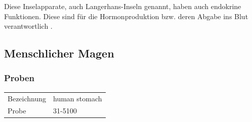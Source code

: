 Diese Inselapparate, auch Langerhans-Inseln genannt, haben auch endokrine
Funktionen. Diese sind für die Hormonproduktion bzw. deren Abgabe ins Blut
verantwortlich \cite{doccheck}.

\newpage
\subsection{Menschlicher Magen}

\subsubsection{Proben}
\begin{table}[h!]
	\centering
	\begin{tabular}{l l}
		Bezeichnung	& human stomach \\
		Probe 		& 31-5100
	\end{tabular}
\end{table}


